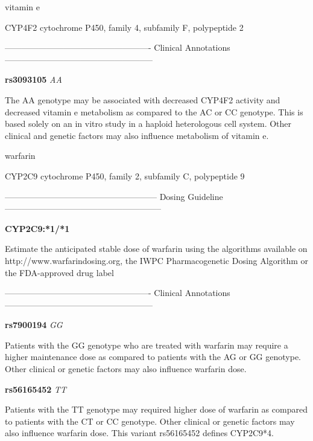\documentclass{resume} %
\begin{document}
\begin{rSection}{ vitamin e }
\begin{rSubsection}{ CYP4F2 }{ cytochrome P450, family 4, subfamily F, polypeptide 2 }{}{}
\item[]

\item[] ---------------------------------------------------- Clinical Annotations -----------------------------------------------------\newline
\item \textbf{ rs3093105 } \textit{ AA }
\item[] The AA genotype may be associated with decreased CYP4F2 activity and decreased vitamin e metabolism as compared to the AC or CC genotype. This is based solely on an in vitro study in a haploid heterologous cell system. Other clinical and genetic factors may also influence metabolism of vitamin e.
\end{rSubsection}

\end{rSection}\begin{rSection}{ warfarin }
\item[]

\begin{rSubsection}{ CYP2C9 }{ cytochrome P450, family 2, subfamily C, polypeptide 9 }{}{}
\item[]
\item[] ------------------------------------------------------ Dosing Guideline --------------------------------------------------------\newline
\item[] \textbf{ CYP2C9:*1/*1 }

\item[] Estimate the anticipated stable dose of warfarin using the algorithms available on http://www.warfarindosing.org, the IWPC Pharmacogenetic Dosing Algorithm or the FDA-approved drug label
\item[] ---------------------------------------------------- Clinical Annotations -----------------------------------------------------\newline
\item \textbf{ rs7900194 } \textit{ GG }
\item[] Patients with the GG genotype who are treated with warfarin may require a higher maintenance dose as compared to patients with the AG or GG genotype.  Other clinical or genetic factors may also influence warfarin dose.\item \textbf{ rs56165452 } \textit{ TT }
\item[] Patients with the TT genotype may required higher dose of warfarin as compared to patients with the CT or CC genotype. Other clinical or genetic factors may also influence  warfarin dose. This variant rs56165452 defines CYP2C9*4.
\end{rSubsection}

\end{rSection}
\end{document}
